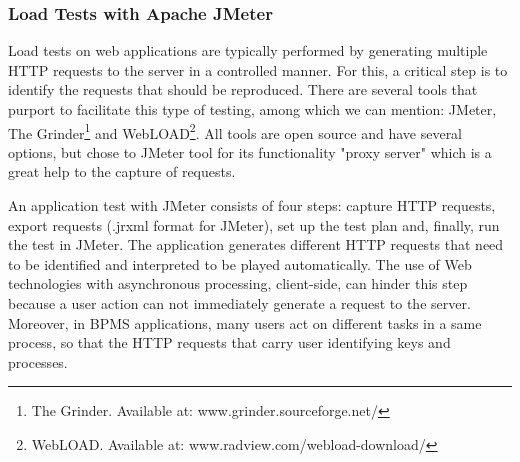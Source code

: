 \documentclass[runningheads,a4paper]{llncs}
\begin{document}
\subsubsection{Load Tests with Apache JMeter}
Load tests on web applications are typically performed by generating multiple HTTP requests to the server in a controlled manner. For this, a critical step is to identify the requests that should be reproduced. There are several tools that purport to facilitate this type of testing, among which we can mention: JMeter, The Grinder\footnote{The Grinder. Available at: www.grinder.sourceforge.net/} and WebLOAD\footnote{WebLOAD. Available at: www.radview.com/webload-download/}. All tools are open source and have several options, but chose to JMeter tool for its functionality "proxy server" which is a great help to the capture of requests.

An application test with JMeter consists of four steps: capture HTTP requests, export requests (.jrxml format for JMeter), set up the test plan and, finally, run the test in JMeter. The application generates different HTTP requests that need to be identified and interpreted to be played automatically. The use of Web technologies with asynchronous processing, client-side, can hinder this step because a user action can not immediately generate a request to the server. Moreover, in BPMS applications, many users act on different tasks in a same process, so that the HTTP requests that carry user identifying keys and processes.
\end{document}
